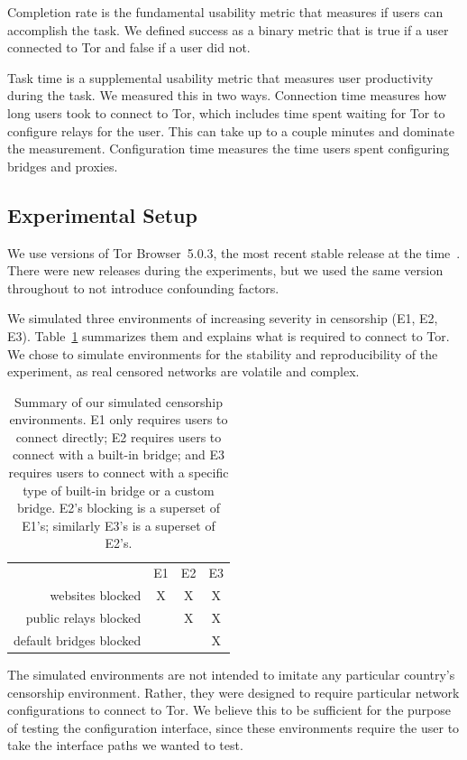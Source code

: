 \documentclass[USenglish,oneside,twocolumn]{article}
\begin{document}
Completion rate is the fundamental usability metric that measures if users can accomplish the task. We defined success as a binary metric that is true if a user connected to Tor and false if a user did not. 

Task time is a supplemental usability metric that measures user productivity during the task. We measured this in two ways. Connection time measures how long users took to connect to Tor, which includes time spent waiting for Tor to configure relays for the user. This can take up to a couple minutes and dominate the measurement. Configuration time measures the time users spent configuring bridges and proxies. 

\subsection{Experimental Setup}
\label{sec:environments}
We use versions of Tor Browser~5.0.3, 
the most recent stable release at the time~\cite{torbrowser-503}.
There were new releases during the experiments, but
we used the same version throughout to not introduce
confounding factors.

We simulated three environments of increasing severity in censorship (E1, E2, E3).
Table~\ref{tab:environments} summarizes them and explains what is required to connect to Tor. We chose to 
simulate environments for the stability and reproducibility of the 
experiment, as real censored networks are volatile and complex. 

\begin{table}[t]
\centering
\begin{tabular}{r c c c}
& E1 & E2 & E3 \\
websites blocked & X & X & X \\
public relays blocked & & X & X \\
default bridges blocked & & & X \\
\end{tabular}
\caption{
Summary of our simulated censorship environments.
E1 only requires users to connect directly;
E2 requires users to connect with a built-in bridge;
and E3 requires users to connect with a specific type of built-in bridge
or a custom bridge.
E2's blocking is a superset of E1's;
similarly E3's is a superset of E2's.
}
\label{tab:environments}
\end{table}

The simulated environments are not intended to imitate any particular country's censorship environment. Rather, they were designed to require particular network configurations
to connect to Tor. We believe this to be sufficient for the purpose of testing the configuration interface, since these environments require the user to take the interface paths we wanted to test. 
\end{document}
